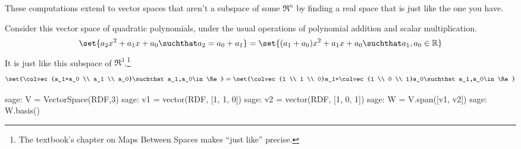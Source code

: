 These computations extend to
vector spaces that aren't a subspace of some $\Re^n$
by finding a real space that is just like the one you have.

Consider this vector space of quadratic polynomials,
under the usual operations of polynomial addition and scalar multiplication.
\begin{equation*}
  \set{ a_2x^2+a_1x+a_0\suchthat a_2=a_0+a_1}           
   =\set{ (a_1+a_0)x^2+a_1x+a_0 \suchthat a_1,a_0\in\Re}
\end{equation*}
It is just like
this subspace of $\Re^3$.\footnote{The textbook's chapter on Maps Between Spaces makes 
``just like'' precise.}
\begin{equation*}
  \set{\colvec{a_1+a_0 \\ a_1 \\ a_0}\suchthat a_1,a_0\in\Re}
  =\set{\colvec{1 \\ 1 \\ 0}a_1+\colvec{1 \\ 0 \\ 1}a_0\suchthat a_1,a_0\in\Re}
\end{equation*}
\begin{sagecommandline}
sage: V = VectorSpace(RDF,3)
sage: v1 = vector(RDF, [1, 1, 0])
sage: v2 = vector(RDF, [1, 0, 1])
sage: W = V.span([v1, v2])
sage: W.basis()
\end{sagecommandline}

